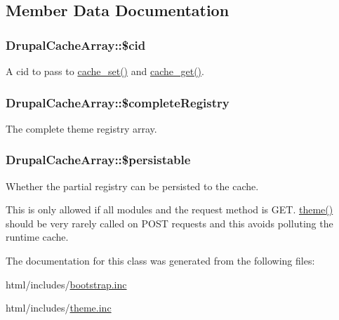 \subsection{Member Data Documentation}
\hypertarget{classDrupalCacheArray_a616fba4b18bafdf4cc6e34c4b5696d58}{
\subsubsection[{\$cid}]{\setlength{\rightskip}{0pt plus 5cm}DrupalCacheArray::\$cid}}
\label{classDrupalCacheArray_a616fba4b18bafdf4cc6e34c4b5696d58}
A cid to pass to \hyperlink{includes_2cache_8inc_a48081f36334909f561ef4f538fa640d2}{cache\_\-set()} and \hyperlink{includes_2cache_8inc_a9d873815c28909b61c3a6188b383f8a3}{cache\_\-get()}. \hypertarget{classDrupalCacheArray_a31477bbed77e94f393202701a2179643}{
\subsubsection[{\$completeRegistry}]{\setlength{\rightskip}{0pt plus 5cm}DrupalCacheArray::\$completeRegistry}}
\label{classDrupalCacheArray_a31477bbed77e94f393202701a2179643}
The complete theme registry array. \hypertarget{classDrupalCacheArray_a7e5f106aba0180abc924fee9b2137dd3}{
\subsubsection[{\$persistable}]{\setlength{\rightskip}{0pt plus 5cm}DrupalCacheArray::\$persistable}}
\label{classDrupalCacheArray_a7e5f106aba0180abc924fee9b2137dd3}
Whether the partial registry can be persisted to the cache.

This is only allowed if all modules and the request method is GET. \hyperlink{includes_2theme_8inc_a7c25609a935874541a19657affd30fff}{theme()} should be very rarely called on POST requests and this avoids polluting the runtime cache. 

The documentation for this class was generated from the following files:\begin{DoxyCompactItemize}
\item 
html/includes/\hyperlink{bootstrap_8inc}{bootstrap.inc}\item 
html/includes/\hyperlink{includes_2theme_8inc}{theme.inc}\end{DoxyCompactItemize}
